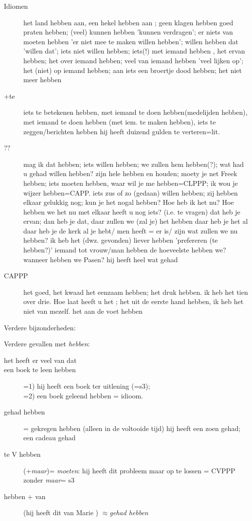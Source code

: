 \begin{description}
  \item[Idiomen] het land hebben aan, een hekel hebben aan ; geen klagen hebben
goed praten hebben; (veel) kunnen hebben 'kunnen verdragen'; er niets van
moeten hebben 'er niet mee te maken willen hebben'; willen hebben dat 'willen
dat'; iets niet willen hebben; iets(!) met iemand hebben , het ervan
hebben; het over iemand hebben; veel van iemand hebben 'veel lijken op';
het (niet) op iemand hebben; aan iets een broertje dood hebben; het niet meer
hebben
  \item[+te]
iets te betekenen hebben,
met iemand te doen hebben(medelijden hebben),
met iemand te doen hebben (met iem. te maken hebben), iets te zeggen/berichten hebben
hij heeft duizend gulden te verteren=lit.
  \item[??] mag ik dat hebben; iets willen hebben; we zullen hem hebben(?);
wat had u gehad willen hebben?
zijn hele hebben en houden;
moety je net Freek hebben;
iets moeten hebben, waar wil je me hebben=CLPPP;
ik wou je wijzer hebben=CAPP.
iets zus of zo (gedaan) willen hebben;
zij hebben elkaar gelukkig nog;
kun je het nogal hebben?
Hoe heb ik het nu?
Hoe hebben we het nu met elkaar
heeft u nog iets? (i.e. te vragen)
dat heb je ervan;
dan heb je dat,
daar zullen we (zal je) het hebben
daar heb je het al
daar heb je de kerk al
je hebt/ men heeft = er is/ zijn
wat zullen we nu hebben?
ik heb het (dwz. gevonden)
liever hebben 'prefereren (te hebben?)'
iemand tot vrouw/man hebben
de hoeveelste hebben we?
wanneer hebben we Pasen?
hij heeft heel wat gehad
\item[CAPPP] het goed, het kwaad het eenzaam hebben; het druk hebben.
ik heb het tien over drie.  Hoe laat heeft u het ; het uit de eerste hand
hebben, ik heb het niet van mezelf.
het aan de voet hebben
\end{description}


Verdere bijzonderheden:







Verdere gevallen met {\em hebben}:
\begin{description}
  \item[het heeft er veel van dat]
  \item[ een boek te leen hebben] =1) hij heeft een boek ter uitlening (=s3);\\
=2) een boek geleend hebben = idioom.

  \item[gehad hebben] = gekregen hebben (alleen in de voltooide tijd)
hij heeft een zoen gehad; een cadeau gehad
  \item[te V hebben] (+{\em maar})= {\em moeten}:
hij heeft dit probleem maar op te lossen = CVPPP
zonder {\em maar}= s3
  \item[hebben + van] (hij heeft dit van Marie ) $\approx${\em gehad hebben}
\end{description}


